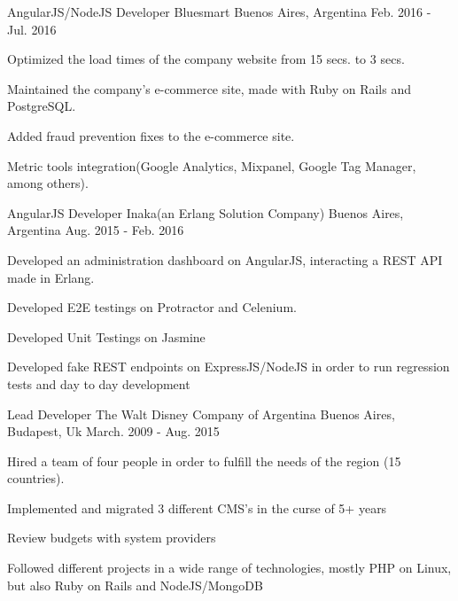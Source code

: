 \begin{cventries}
    \cventry
    {AngularJS/NodeJS Developer} %
    {Bluesmart} %
    {Buenos Aires, Argentina} %
    {Feb. 2016 - Jul. 2016} %
    {
    \begin{cvitems} %
        \item {Optimized the load times of the company website from 15 secs. to 3 secs.}
        \item {Maintained the company's e-commerce site, made with Ruby on Rails and PostgreSQL.}
        \item {Added fraud prevention fixes to the e-commerce site.}
        \item {Metric tools integration(Google Analytics, Mixpanel, Google Tag Manager, among others).}
    \end{cvitems}
    }

    \cventry
    {AngularJS Developer} %
    {Inaka(an Erlang Solution Company)} %
    {Buenos Aires, Argentina} %
    {Aug. 2015 - Feb. 2016} %
    {
    \begin{cvitems} %
        \item {Developed an administration dashboard on AngularJS, interacting a REST API made in Erlang.}
        \item {Developed E2E testings on Protractor and Celenium.}
        \item {Developed Unit Testings on Jasmine}
        \item {Developed fake REST endpoints on ExpressJS/NodeJS in order to run regression tests and day to day development}
    \end{cvitems}
    }
    \cventry
    {Lead Developer} %
    {The Walt Disney Company of Argentina} %
    {Buenos Aires, Budapest, Uk} %
    {March. 2009 - Aug. 2015} %
    {
    \begin{cvitems} %
        \item {Hired a team of four people in order to fulfill the needs of the region (15 countries).}
        \item {Implemented and migrated 3 different CMS's in the curse of 5+ years}
        \item {Review budgets with system providers}
        \item {Followed different projects in a wide range of technologies, mostly PHP on Linux, but also Ruby on Rails and NodeJS/MongoDB}
    \end{cvitems}
    }


\end{cventries}
